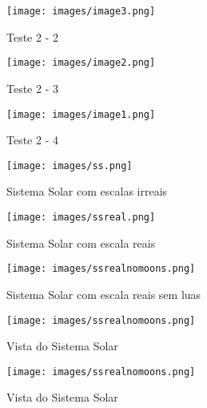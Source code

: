 \documentclass{article}
\begin{document}
\begin{figure}[h]
    \centering
    \texttt{[image: images/image3.png]}
    \caption{Teste 2 - 2}
    \label{fig:exemplo}
\end{figure}

\begin{figure}[h]
    \centering
    \texttt{[image: images/image2.png]}
    \caption{Teste 2 - 3}
    \label{fig:exemplo}
\end{figure}

\begin{figure}[h]
    \centering
    \texttt{[image: images/image1.png]}
    \caption{Teste 2 - 4}
    \label{fig:exemplo}
\end{figure}

\begin{figure}[h]
    \centering
    \texttt{[image: images/ss.png]}
    \caption{Sistema Solar com escalas irreais}
    \label{fig: exemplo}
\end{figure}

\begin{figure}[h]
    \centering
    \texttt{[image: images/ssreal.png]}
    \caption{Sistema Solar com escala reais}
    \label{fig:exemplo}
\end{figure}

\begin{figure}[h]
    \centering
    \texttt{[image: images/ssrealnomoons.png]}
    \caption{Sistema Solar com escala reais sem luas}
    \label{fig:exemplo}
\end{figure}

\begin{figure}[h]
    \centering
    \texttt{[image: images/ssrealnomoons.png]}
    \caption{Vista do Sistema Solar}
    \label{fig:exemplo}
\end{figure}

\begin{figure}[h]
    \centering
    \texttt{[image: images/ssrealnomoons.png]}
    \caption{Vista do Sistema Solar}
    \label{fig:exemplo}
\end{figure}
\end{document}
